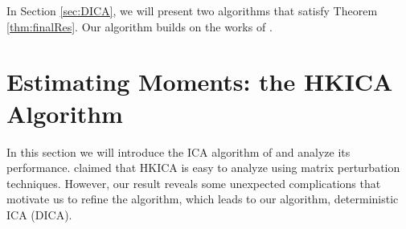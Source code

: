 \documentclass[11pt]{article}
\begin{document}
In Section \ref{sec:DICA}, we will present two algorithms that satisfy Theorem \ref{thm:finalRes}.
Our algorithm builds on the works of \citet{frieze1996learning,hsu2013learning,arora2012provable}. 

\section{Estimating Moments: the HKICA Algorithm}
\label{sec:HKICA}
In this section we will introduce the ICA algorithm of \citet{hsu2013learning} and analyze its performance.
\citet{hsu2013learning} claimed that HKICA is easy to analyze using matrix perturbation techniques.
However, our result reveals some unexpected complications that motivate us to refine the algorithm, which leads to our algorithm, deterministic ICA (DICA). 
\end{document}
